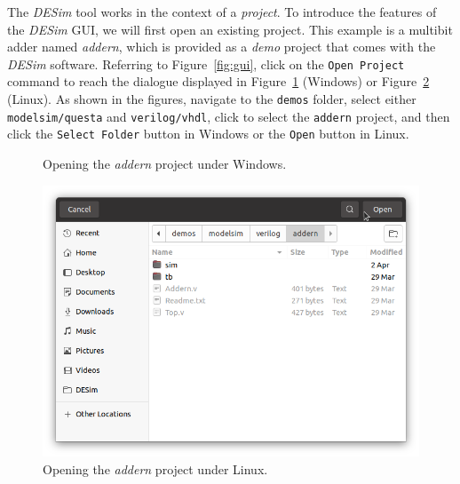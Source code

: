 The {\it DESim} tool works in the context of a {\it project}. To introduce the features of the 
{\it DESim} GUI, we will first open an existing project. This example is a multibit adder 
named {\it addern}, which is provided as a {\it demo} project that comes with the {\it DESim}
software. Referring to Figure~\ref{fig:gui}, click on the \texttt{Open Project} command 
to reach the dialogue displayed in Figure~\ref{fig:open_windows} (Windows) or 
Figure~\ref{fig:open_linux} (Linux). As shown in the figures, navigate
to the \texttt{demos} folder, select either \texttt{modelsim/questa} and \texttt{verilog/vhdl},
click to select the \texttt{addern} project, and then click the
\texttt{Select Folder} button in Windows or the \texttt{Open} button in Linux.

\begin{figure}[h]
	\begin{center}
        \setlength{\fboxsep}{0pt}
	\end{center}
		  \caption{Opening the {\it addern} project under Windows.}
	\label{fig:open_windows}
\end{figure}

\begin{figure}[h]
	\begin{center}
        \setlength{\fboxsep}{0pt}
        \includegraphics[width = .75\textwidth]{figures/open_addern_linux.png}
	\end{center}
		  \caption{Opening the {\it addern} project under Linux.}
	\label{fig:open_linux}
\end{figure}


